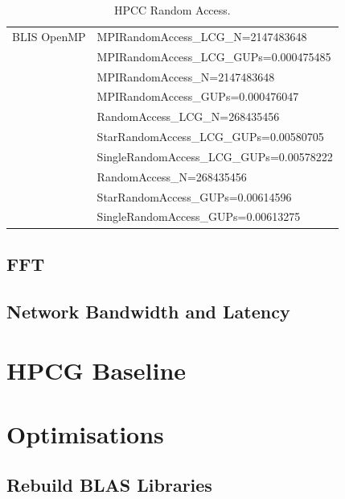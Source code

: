 \documentclass{report}
\begin{document}
\begin{table}[H]
\begin{center}
\begin{tabular}{ |l|l| }
\hline
BLIS OpenMP     & MPIRandomAccess\_LCG\_N=2147483648 \\
                & MPIRandomAccess\_LCG\_GUPs=0.000475485 \\
                \cline{2-2} 
                & MPIRandomAccess\_N=2147483648 \\
                & MPIRandomAccess\_GUPs=0.000476047 \\
                \cline{2-2} 
                & RandomAccess\_LCG\_N=268435456 \\
                & StarRandomAccess\_LCG\_GUPs=0.00580705 \\
                & SingleRandomAccess\_LCG\_GUPs=0.00578222 \\
                \cline{2-2} 
                & RandomAccess\_N=268435456 \\
                & StarRandomAccess\_GUPs=0.00614596 \\
                & SingleRandomAccess\_GUPs=0.00613275 \\
\hline
\end{tabular}
\end{center}
\caption{\label{tab:table-name}HPCC Random Access.}
\end{table}


%
%
\subsection{FFT}


%
%
\subsection{Network Bandwidth and Latency}



%
%
\section{HPCG Baseline}






%
%
\section{Optimisations}


%
%
\subsection{Rebuild BLAS Libraries}
\end{document}
